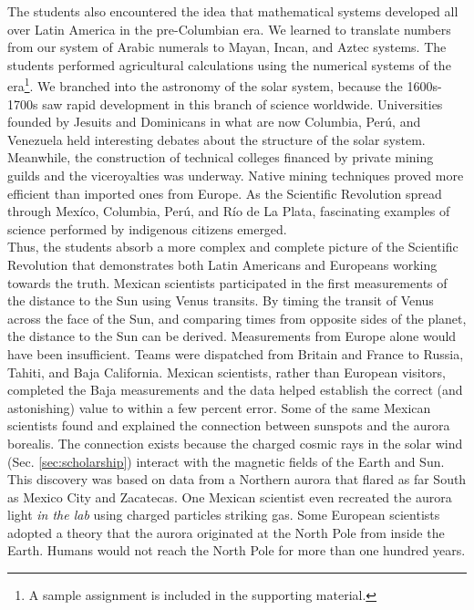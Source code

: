 \documentclass[../../../main.tex]{subfiles}
\begin{document}
The students also encountered the idea that mathematical systems developed all over Latin America in the pre-Columbian era.  We learned to translate numbers from our system of Arabic numerals to Mayan, Incan, and Aztec systems.  The students performed agricultural calculations using the numerical systems of the era\footnote{A sample assignment is included in the supporting material.}.  We branched into the astronomy of the solar system, because the 1600s-1700s saw rapid development in this branch of science worldwide.  Universities founded by Jesuits and Dominicans in what are now Columbia, Per\'{u}, and Venezuela held interesting debates about the structure of the solar system.  Meanwhile, the construction of technical colleges financed by private mining guilds and the viceroyalties was underway.  Native mining techniques proved more efficient than imported ones from Europe.  As the Scientific Revolution spread through Mex\'{i}co, Columbia, Per\'{u}, and R\'{i}o de La Plata, fascinating examples of science performed by indigenous citizens emerged.
\\
\vspace{0.15cm}
Thus, the students absorb a more complex and complete picture of the Scientific Revolution that demonstrates both Latin Americans and Europeans working towards the truth. Mexican scientists participated in the first measurements of the distance to the Sun using Venus transits.  By timing the transit of Venus across the face of the Sun, and comparing times from opposite sides of the planet, the distance to the Sun can be derived.  Measurements from Europe alone would have been insufficient.  Teams were dispatched from Britain and France to Russia, Tahiti, and Baja California.  Mexican scientists, rather than European visitors, completed the Baja measurements and the data helped establish the correct (and astonishing) value to within a few percent error.  Some of the same Mexican scientists found and explained the connection between sunspots and the aurora borealis.  The connection exists because the charged cosmic rays in the solar wind (Sec. \ref{sec:scholarship}) interact with the magnetic fields of the Earth and Sun.  This discovery was based on data from a Northern aurora that flared as far South as Mexico City and Zacatecas.  One Mexican scientist even recreated the aurora light \textit{in the lab} using charged particles striking gas.  Some European scientists adopted a theory that the aurora originated at the North Pole from inside the Earth.  Humans would not reach the North Pole for more than one hundred years.
\end{document}

